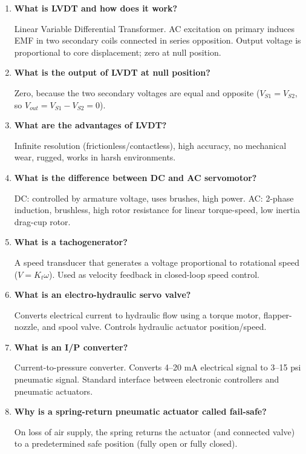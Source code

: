 \documentclass[12pt,a4paper]{article}
\newcommand{\Q}[1]{\textbf{#1}\par\noindent\ignorespaces}
\begin{document}
\begin{tcolorbox}[exambox, title={\textbf{Frequently Asked / Viva Questions}}]
\begin{enumerate}[topsep=0pt, label=\textbf{Q\arabic*.}, itemsep=5pt]
  \item \Q{What is LVDT and how does it work?}
    Linear Variable Differential Transformer. AC excitation on primary induces EMF in two secondary coils connected in series opposition. Output voltage is proportional to core displacement; zero at null position.
  \item \Q{What is the output of LVDT at null position?}
    Zero, because the two secondary voltages are equal and opposite ($V_{S1} = V_{S2}$, so $V_{out} = V_{S1} - V_{S2} = 0$).
  \item \Q{What are the advantages of LVDT?}
    Infinite resolution (frictionless/contactless), high accuracy, no mechanical wear, rugged, works in harsh environments.
  \item \Q{What is the difference between DC and AC servomotor?}
    DC: controlled by armature voltage, uses brushes, high power. AC: 2-phase induction, brushless, high rotor resistance for linear torque-speed, low inertia drag-cup rotor.
  \item \Q{What is a tachogenerator?}
    A speed transducer that generates a voltage proportional to rotational speed ($V = K_t\omega$). Used as velocity feedback in closed-loop speed control.
  \item \Q{What is an electro-hydraulic servo valve?}
    Converts electrical current to hydraulic flow using a torque motor, flapper-nozzle, and spool valve. Controls hydraulic actuator position/speed.
  \item \Q{What is an I/P converter?}
    Current-to-pressure converter. Converts 4--20 mA electrical signal to 3--15 psi pneumatic signal. Standard interface between electronic controllers and pneumatic actuators.
  \item \Q{Why is a spring-return pneumatic actuator called fail-safe?}
    On loss of air supply, the spring returns the actuator (and connected valve) to a predetermined safe position (fully open or fully closed).
\end{enumerate}
\end{tcolorbox}
\end{document}
